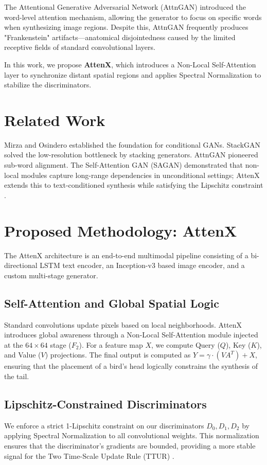 \documentclass[conference]{IEEEtran}
\begin{document}
The Attentional Generative Adversarial Network (AttnGAN) \cite{xu2018attngan} introduced the word-level attention mechanism, allowing the generator to focus on specific words when synthesizing image regions. Despite this, AttnGAN frequently produces "Frankenstein" artifacts—anatomical disjointedness caused by the limited receptive fields of standard convolutional layers. 

In this work, we propose \textbf{AttenX}, which introduces a Non-Local Self-Attention layer to synchronize distant spatial regions and applies Spectral Normalization to stabilize the discriminators.

\section{Related Work}
Mirza and Osindero \cite{mirza2014conditional} established the foundation for conditional GANs. StackGAN \cite{zhang2017stackgan} solved the low-resolution bottleneck by stacking generators. AttnGAN \cite{xu2018attngan} pioneered sub-word alignment. The Self-Attention GAN (SAGAN) \cite{zhang2019self} demonstrated that non-local modules capture long-range dependencies in unconditional settings; AttenX extends this to text-conditioned synthesis while satisfying the Lipschitz constraint \cite{miyato2018spectral}.

\section{Proposed Methodology: AttenX}
The AttenX architecture is an end-to-end multimodal pipeline consisting of a bi-directional LSTM text encoder, an Inception-v3 based image encoder, and a custom multi-stage generator.

\subsection{Self-Attention and Global Spatial Logic}
Standard convolutions update pixels based on local neighborhoods. AttenX introduces global awareness through a Non-Local Self-Attention module injected at the $64 \times 64$ stage ($F_2$). For a feature map $X$, we compute Query ($Q$), Key ($K$), and Value ($V$) projections. The final output is computed as $Y = \gamma \cdot (V A^T) + X$, ensuring that the placement of a bird's head logically constrains the synthesis of the tail.

\subsection{Lipschitz-Constrained Discriminators}
We enforce a strict 1-Lipschitz constraint on our discriminators $D_0, D_1, D_2$ by applying Spectral Normalization \cite{miyato2018spectral} to all convolutional weights. This normalization ensures that the discriminator's gradients are bounded, providing a more stable signal for the Two Time-Scale Update Rule (TTUR) \cite{heusel2017gans}.
\end{document}
